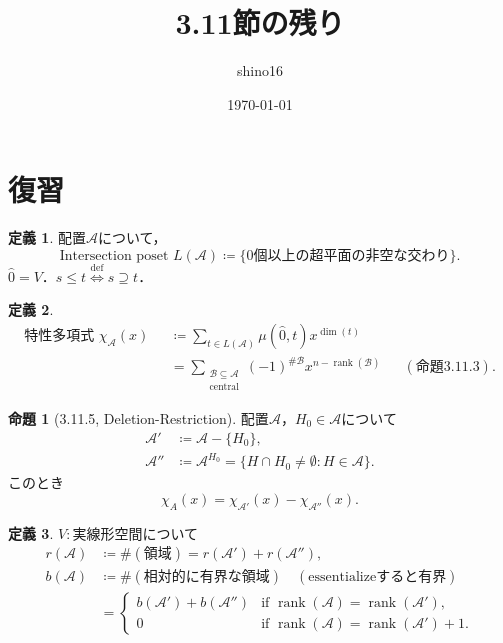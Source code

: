 \documentclass[xelatex,ja=standard,a4paper,14pt,everyparhook=compat]{bxjsarticle}
\title{3.11節の残り}
\author{shino16}
\date{\today}
\newcommand{\mcA}{\mathcal{A}}
\newcommand{\mcB}{\mathcal{B}}
\DeclareMathOperator{\rank}{rank}
\theoremstyle{definition}
\newtheorem*{definition}{定義}
\newtheorem*{proposition}{命題}
\begin{document}
\maketitle

\tableofcontents

\newpage

\setcounter{section}{-1}
\section{復習}

\begin{definition}
    配置$\mcA$について， \begin{equation*}
        \text{Intersection poset $L(\mcA) \coloneqq \{\text{$0$個以上の超平面の非空な交わり}\}$}.
    \end{equation*}
    $\hat 0 = V$．$s \leq t \overset{\mathrm{def}}{\iff} s \supseteq t$．
\end{definition}

\begin{definition}
    \begin{align*}
        \text{特性多項式 $\chi_\mcA(x)$ }
         & \coloneqq \sum_{t \in L(\mcA)} \mu(\hat0, t) x^{\dim(t)} \\
         & = \sum_{\substack{\mcB \subseteq \mcA                    \\ \text{central}}} (-1)^{\#\mcB} x^{n - \rank(\mcB)} && (\text{命題3.11.3}).
    \end{align*}
\end{definition}

\begin{proposition}[3.11.5, Deletion-Restriction]
    配置$\mcA$，$H_0 \in \mcA$について \begin{align*}
        \mcA'  & \coloneqq \mcA - \{H_0\},                                          \\
        \mcA'' & \coloneqq \mcA^{H_0} = \{H \cap H_0 \neq \emptyset : H \in \mcA\}.
    \end{align*}
    このとき \begin{equation*}
        \chi_A(x) = \chi_{\mcA'}(x) - \chi_{\mcA''}(x).
    \end{equation*}
\end{proposition}

\begin{definition}
    $V : \text{実線形空間}$について \begin{align*}
        r(\mcA) & \coloneqq \#(\text{領域}) = r(\mcA') + r(\mcA''),                             \\
        b(\mcA) & \coloneqq \#(\text{相対的に有界な領域}) \quad (\text{essentializeすると有界}) \\
                & = \begin{cases}
            b(\mcA') + b(\mcA'') & \text{if $\rank(\mcA) = \rank(\mcA')$,}     \\
            0                    & \text{if $\rank(\mcA) = \rank(\mcA') + 1$.}
        \end{cases}
    \end{align*}
\end{definition}
\end{document}
